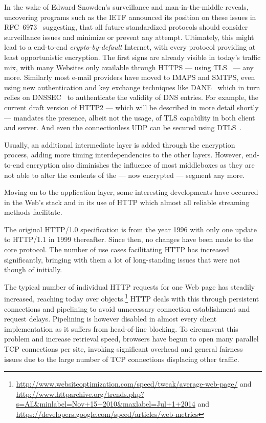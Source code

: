 In the wake of Edward Snowden's surveillance and man-in-the-middle reveals, uncovering programs such as  the \gls{IETF} announced its position on these issues in \gls{RFC}~6973~\cite{rfc6973} suggesting, that all future standardized protocols should consider surveillance issues and minimize or prevent any attempt. Ultimately, this might lead to a end-to-end \textit{crypto-by-default} Internet, with every protocol providing at least opportunistic encryption. The first signs are already visible in today's traffic mix, with many Websites only available through \acrshort{HTTPS} --- using \gls{TLS}~\cite{rfc5246} --- any more. Similarly most e-mail providers have moved to \acrshort{IMAPS} and \acrshort{SMTPS}, even using new authentication and key exchange techniques like \gls{DANE}~\cite{rfc6698} which in turn relies on \gls{DNSSEC}~\cite{rfc4033} to authenticate the validity of \gls{DNS} entries. For example, the current draft version of HTTP2 --- which will be described in more detail shortly --- mandates the presence, albeit not the usage, of \gls{TLS} capability in both client and server. And even the connectionless \gls{UDP} can be secured using \gls{DTLS}~\cite{rfc6347}.

Usually, an additional intermediate layer is added through the encryption process, adding more timing interdependencies to the other layers. However, end-to-end encryption also diminishes the influence of most middleboxes as they are not able to alter the contents of the --- now encrypted --- segment any more.


Moving on to the application layer, some interesting developments have occurred in the Web's stack and in its use of \gls{HTTP} which almost all reliable streaming methods facilitate.

The original HTTP/1.0 specification is from the year 1996 with only one update to HTTP/1.1 in 1999 thereafter. Since then, no changes have been made to the core protocol. The number of use cases facilitating \gls{HTTP} has increased significantly, bringing with them a lot of long-standing issues that were not though of initially.

The typical number of individual \gls{HTTP} requests for one Web page has steadily increased, reaching today over  objects.\footnote{\url{http://www.websiteoptimization.com/speed/tweak/average-web-page/} and \url{http://www.httparchive.org/trends.php?s=All&minlabel=Nov+15+2010&maxlabel=Jul+1+2014} and \url{https://developers.google.com/speed/articles/web-metrics}} \gls{HTTP} deals with this through persistent connections and pipelining to avoid unnecessary connection establishment and request delays. Pipelining is however disabled in almost every client implementation as it suffers from head-of-line blocking. To circumvent this problem and increase retrieval speed, browsers have begun to open many parallel \gls{TCP} connections per site, invoking significant overhead and general fairness issues due to the large number of \gls{TCP} connections displacing other traffic.

